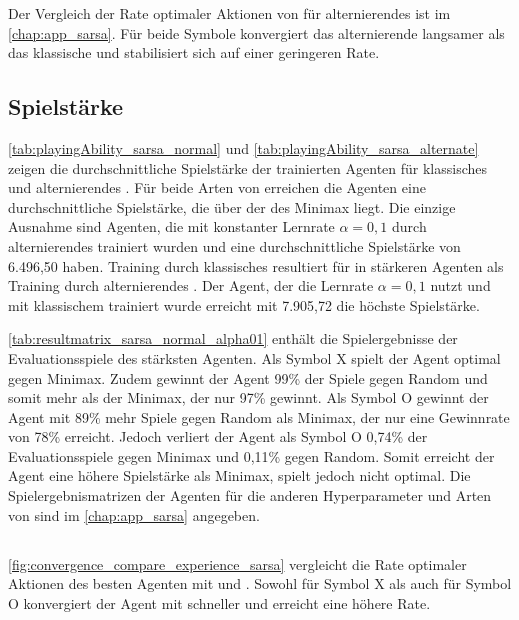 Der Vergleich der Rate optimaler Aktionen von \sarsa für alternierendes \splay ist im \cref{chap:app_sarsa}. 
Für beide Symbole konvergiert das alternierende \splay langsamer als das klassische \splay und stabilisiert sich auf einer geringeren Rate.


\subsection{Spielstärke}
\cref{tab:playingAbility_sarsa_normal} und \cref{tab:playingAbility_sarsa_alternate} zeigen die durchschnittliche Spielstärke der trainierten Agenten für klassisches und alternierendes \splay. Für beide Arten von \splay erreichen die Agenten eine durchschnittliche Spielstärke, die über der des Minimax liegt. 
Die einzige Ausnahme sind Agenten, die mit konstanter Lernrate $\alpha=0,1$ durch alternierendes \splay trainiert wurden und eine durchschnittliche Spielstärke von 6.496,50 haben. 
Training durch klassisches \splay resultiert für \sarsa in stärkeren Agenten als Training durch alternierendes \splay. 
Der \sarsa Agent, der die Lernrate $\alpha=0,1$ nutzt und mit klassischem \splay trainiert wurde erreicht mit 7.905,72 die höchste Spielstärke. 

\cref{tab:resultmatrix_sarsa_normal_alpha01} enthält die Spielergebnisse der Evaluationsspiele des stärksten \sarsa Agenten. 
Als Symbol X spielt der \sarsa Agent optimal gegen Minimax. 
Zudem gewinnt der Agent 99\% der Spiele gegen Random und somit mehr als der Minimax, der nur 97\% gewinnt. 
Als Symbol O gewinnt der Agent mit 89\% mehr Spiele gegen Random als Minimax, der nur eine Gewinnrate von 78\% erreicht.
Jedoch verliert der Agent als Symbol O 0,74\% der Evaluationsspiele gegen Minimax und 0,11\% gegen Random.
Somit erreicht der Agent eine höhere Spielstärke als Minimax, spielt jedoch nicht optimal. 
Die Spielergebnismatrizen der \sarsa Agenten für die anderen Hyperparameter und Arten von \splay sind im \cref{chap:app_sarsa} angegeben.





\subsection{\wtable}
\cref{fig:convergence_compare_experience_sarsa} vergleicht die Rate optimaler Aktionen des besten \sarsa Agenten mit \qtable und \wtable. 
Sowohl für Symbol X als auch für Symbol O konvergiert der Agent mit \wtable schneller und erreicht eine höhere Rate. 

